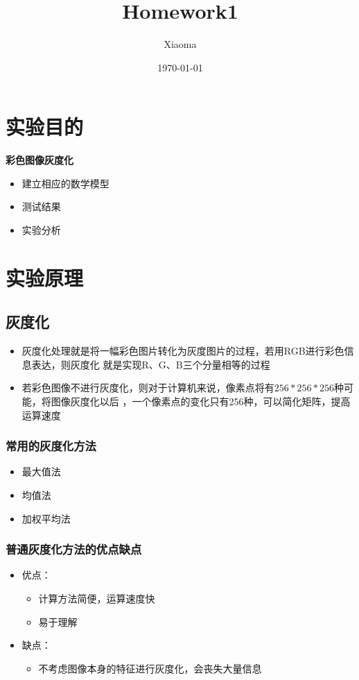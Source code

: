 \documentclass[12pt, a4paper, oneside]{ctexart}
\title{Homework1}
\author{Xiaoma}
\date{\today}
\begin{document}
\maketitle
\section{实验目的}
\textbf{彩色图像灰度化}
\begin{itemize}
    \item 建立相应的数学模型
    \item 测试结果
    \item 实验分析
\end{itemize}

\section{实验原理}
\subsection{灰度化}
\begin{itemize}
    \item 灰度化处理就是将一幅彩色图片转化为灰度图片的过程，若用RGB进行彩色信息表达，则灰度化
    就是实现R、G、B三个分量相等的过程
    \item 若彩色图像不进行灰度化，则对于计算机来说，像素点将有$256*256*256$种可能，将图像灰度化以后
    ，一个像素点的变化只有256种，可以简化矩阵，提高运算速度
\end{itemize}

\subsubsection{常用的灰度化方法}
\begin{itemize}
    \item 最大值法
    \item 均值法
    \item 加权平均法
\end{itemize}

\subsubsection{普通灰度化方法的优点缺点}
\begin{itemize}
    \item 优点： \begin{itemize}
        \item 计算方法简便，运算速度快
        \item 易于理解
    \end{itemize}
    \item 缺点： \begin{itemize}
        \item 不考虑图像本身的特征进行灰度化，会丧失大量信息
    \end{itemize}
\end{itemize}
\end{document}
